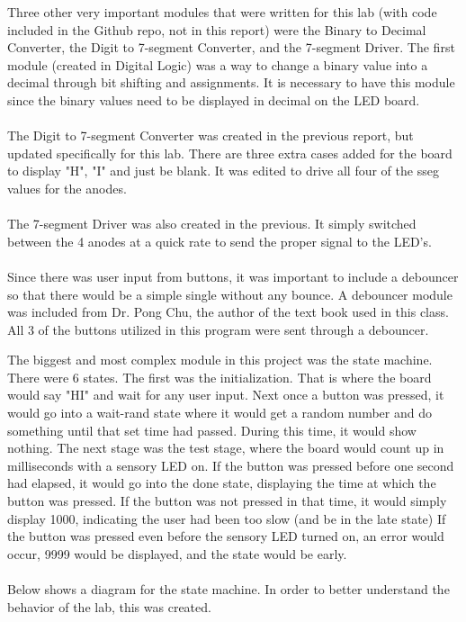 \documentclass[11pt]{article}
\begin{document}
Three other very important modules that were written for this lab (with code included in the Github repo, not in this report) were the Binary to Decimal Converter, the Digit to 7-segment Converter, and the 7-segment Driver. The first module (created in Digital Logic) was a way to change a binary value into a decimal through bit shifting and assignments. It is necessary to have this module since the binary values need to be displayed in decimal on the LED board.\\\\ The Digit to 7-segment Converter was created in the previous report, but updated specifically for this lab. There are three extra cases added for the board to display "H", "I" and just be blank. It was edited to drive all four of the sseg values for the anodes. \\\\ The 7-segment Driver was also created in the previous. It simply switched between the 4 anodes at a quick rate to send the proper signal to the LED's. \\\\

Since there was user input from buttons, it was important to include a debouncer so that there would be a simple single without any bounce. A debouncer module was included from Dr. Pong Chu, the author of the text book used in this class. All 3 of the buttons utilized in this program were sent through a debouncer. 

The biggest and most complex module in this project was the state machine. There were 6 states. The first was the initialization. That is where the board would say "HI" and wait for any user input. Next once a button was pressed, it would go into a wait-rand state where it would get a random number and do something until that set time had passed. During this time, it would show nothing. The next stage was the test stage, where the board would count up in milliseconds with a sensory LED on. If the button was pressed before one second had elapsed, it would go into the done state, displaying the time at which the button was pressed. If the button was not pressed in that time, it would simply display 1000, indicating the user had been too slow (and be in the late state) If the button was pressed even before the sensory LED turned on, an error would occur, 9999 would be displayed, and the state would be early.\\\\
\newpage
Below shows a diagram for the state machine. In order to better understand the behavior of the lab, this was created. 
\end{document}
